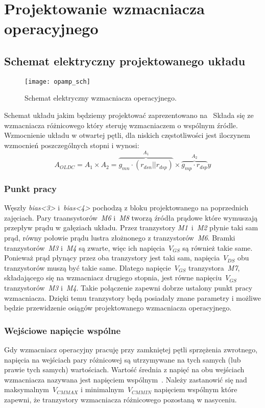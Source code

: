 \documentclass[twoside,pl,final]{labman}
\begin{document}
\chapter{Projektowanie wzmacniacza operacyjnego}
\label{opamp}

\section{Schemat elektryczny projektowanego układu}
\label{opamp:schematic}
\begin{figure}[!htbp]
  \centering
  \texttt{[image: opamp\_sch]}
  \caption{Schemat elektryczny wzmacniacza operacyjnego.}
  \label{fig:opamp:sch}
\end{figure}

Schemat układu jakim będziemy projektować zaprezentowano na~
Składa się ze wzmacniacza różnicowego który steruję wzmacniaczem o wspólnym źródle.
Wzmocnienie układu w otwartej pętli,
dla niskich częstotliwości jest iloczynem wzmocnień poszczególnych stopni i wynosi:
\begin{equation}
  A_{OLDC} = A_1 \times A_2 = \overbrace{g_{mn} \cdot (r_{dsn} || r_{dsp})}^{A_1} \times \overbrace{g_{mp} \cdot r_{dsp}}^{A_2}y
\end{equation}

\subsection{Punkt pracy}
\label{opamp:schematic:op}
Węszły \emph{bias<3>} i~\emph{bias<4>} pochodzą z bloku projektowanego na poprzednich zajęciach.
Pary traansystorów~\emph{M6} i~\emph{M8} tworzą źródła prądowe które wymuszają przepływ prądu w gałęziach układu.
Przez tranzystory \emph{M1}~i~\emph{M2} płynie taki sam prąd,
równy połowie prądu lustra złożnonego z tranzystorów~\emph{M6}.
Bramki tranzystorów~\emph{M3} i~\emph{M4} są zwarte, więc ich napięcia~$V_{GS}$ są również takie same.
Ponieważ prąd płynący przez oba tranzystory jest taki sam,
napięcia~$V_{DS}$ obu tranzystorów muszą być takie same.
Dlatego napięcie~$V_{GS}$ tranzystora~\emph{M7}, składającego się na wzmacniacz drugiego stopnia,
jest równe napięciu~$V_{GS}$ tranzystorów~\emph{M3} i~\emph{M4}.
Takie połączenie zapewni dobrze ustalony punkt pracy wzmacniacza.
Dzięki temu tranzystory będą posiadały znane parametry i możliwe będzie przewidzenie osiągów projektowanego wzmacniacza operacyjnego.

\subsection{Wejściowe napięcie wspólne}
\label{opamp:schematic:cm}
Gdy wzmacniacz operacyjny pracuję przy zamkniętej pętli sprzężenia zwrotnego,
napięcia na wejściach pary różnicowej są utrzymywane na tych samych (lub prawie tych samych) wartościach.
Wartość średnia z napięć na obu wejściach wzmacniacza nazywana jest napięciem wspólnym~.
Należy zastanowić się nad maksymalnym~$V_{CMMAX}$ i minimalnym~$V_{CMMIN}$ napięciem wspólnym które zapewni,
że tranzystory wzmacniacza różnicowego pozostaną w nasyceniu.
\end{document}
